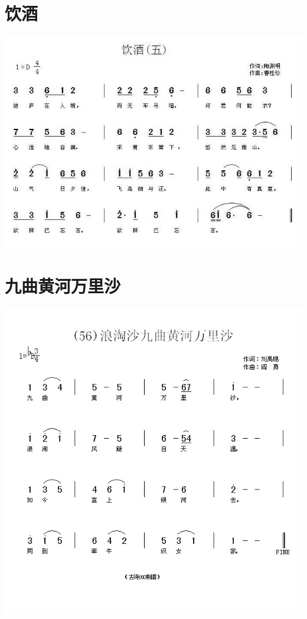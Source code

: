 \documentclass[cn,pad,twocol]{elegantbook}
\begin{document}
\section{饮酒}
    \includegraphics[width=\textwidth]{dongxiao/20200808-饮酒-陶渊明.jpg}
\section{九曲黄河万里沙}
    \includegraphics[width=\textwidth]{dongxiao/20200808-浪淘沙-九曲黄河万里沙-刘禹锡.jpg}
\end{document}
